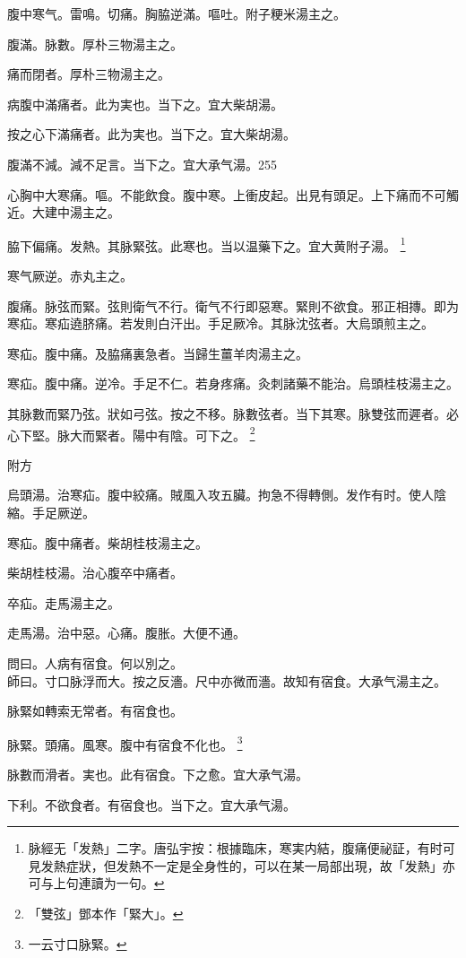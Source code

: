 腹中寒气。雷鳴。切痛。胸脇逆滿。嘔吐。附子粳米湯主之。

腹滿。脉數。厚朴三物湯主之。{\wuben}

痛而閉者。厚朴三物湯主之。{\dengben}

病腹中滿痛者。此为実也。当下之。宜大柴胡湯。{\wuben}

按之心下滿痛者。此为実也。当下之。宜大柴胡湯。{\dengben}

腹滿不減。減不足言。当下之。宜{\khaaitp 大}承气湯。255

心胸中大寒痛。嘔。不能飲食。腹中寒。上衝皮起。出見有頭足。上下痛而不可觸近。大建中湯主之。

脇下偏痛。{\khaaitp 发熱。}其脉緊弦。此寒也。{\khaaitp 当}以温藥下之。宜大黄附子湯。
	\footnote{
		脉經无「发熱」二字。唐弘宇按：根據臨床，寒実内結，腹痛便祕証，有时可見发熱症狀，但发熱不一定是全身性的，可以在某一局部出現，故「发熱」亦可与上句連讀为一句。
	}

寒气厥逆。赤丸主之。

腹痛。脉弦而緊。弦則衛气不行。{\khaaitp 衛气不行}即惡寒。緊則不欲食。邪正相摶。即为寒疝。寒疝遶脐痛。若发則白汗出。手足厥冷。其脉沈弦者。大烏頭煎主之。

寒疝。腹中痛。及脇痛裏急者。当歸生薑羊肉湯主之。

寒疝。腹中痛。逆冷。手足不仁。若身疼痛。灸刺諸藥不能治。烏頭桂枝湯主之。

其脉數而緊乃弦。狀如弓弦。按之不移。脉數弦者。当下其寒。脉雙弦而遲者。必心下堅。脉大而緊者。陽中有陰。可下之。
	\footnote{
		「雙弦」鄧本作「緊大」。
	}

附方

烏頭湯。治寒疝。腹中絞痛。賊風入攻五臟。拘急不得轉側。发作有时。使人陰縮。手足厥逆。

寒疝。腹中痛者。柴胡桂枝湯主之。{\wuben}

柴胡桂枝湯。治心腹卒中痛者。{\dengben}

卒疝。走馬湯主之。{\wuben}

走馬湯。治中惡。心痛。腹胀。大便不通。{\dengben}

問曰。人病有宿食。何以別之。\\
師曰。寸口脉浮而大。按之反濇。尺中亦微而濇。故知有宿食。大承气湯主之。

脉緊如轉索无常者。有宿食也。

脉緊。頭痛。風寒。腹中有宿食不化也。
\footnote{一云寸口脉緊。}

脉數而滑者。実也。此有宿食。下之愈。宜大承气湯。

下利。不欲食者。有宿食也。当下之。宜大承气湯。

